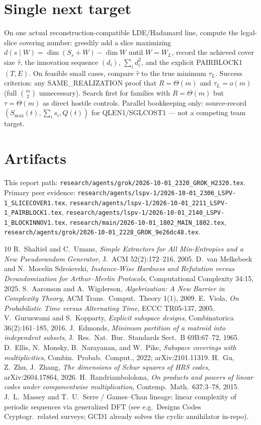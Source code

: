 \documentclass[11pt]{article}
\begin{document}
\section*{Single next target}
On one actual reconstruction-compatible LDE/Hadamard line, compute the legal-slice covering number:
greedily add a slice maximizing $d(s\mid W)=\dim(S_s+W)-\dim W$ until $W=W_L$, record the achieved
cover size $\widehat\tau$, the innovation sequence $(d_i)$, $\sum_i d_i^2$, and the explicit PAIRBLOCK1
$(T,E)$. On feasible small cases, compare $\widehat\tau$ to the true minimum $\tau_L$.
Success criterion: any SAME\_REALIZATION proof that $R=\Theta(m)$ and $\tau_L=o(m)$
(full $\binom{m}{2}$ unnecessary). Search first for families with $R=\Theta(m)$ but $\tau=\Theta(m)$
as direct hostile controls. Parallel bookkeeping only: source-record $(S_{\max}(t),\sum_i s_i,Q(t))$
for QLEN1/SGLCOST1 --- not a competing team target.

\section*{Artifacts}
This report path:
\texttt{research/agents/grok/2026-10-01\_2320\_GROK\_H2320.tex}.
Primary peer evidence:
\texttt{research/agents/lspv-1/2026-10-01\_2306\_LSPV-1\_SLICECOVER1.tex},
\texttt{research/agents/lspv-1/2026-10-01\_2211\_LSPV-1\_PAIRBLOCK1.tex},
\texttt{research/agents/lspv-1/2026-10-01\_2140\_LSPV-1\_BLOCKINNOV1.tex},
\texttt{research/main/2026-10-01\_1802\_MAIN\_1802.tex},
\texttt{research/agents/grok/2026-10-01\_2228\_GROK\_9e26dc48.tex}.

\begin{thebibliography}{10}
 R.~Shaltiel and C.~Umans, \emph{Simple Extractors for All Min-Entropies and a New Pseudorandom Generator}, J.~ACM 52(2):172--216, 2005.
 D.~van Melkebeek and N.~Mocelin Sdroievski, \emph{Instance-Wise Hardness and Refutation versus Derandomization for Arthur--Merlin Protocols}, Computational Complexity 34:15, 2025.
 S.~Aaronson and A.~Wigderson, \emph{Algebrization: A New Barrier in Complexity Theory}, ACM Trans.\ Comput.\ Theory 1(1), 2009.
 E.~Viola, \emph{On Probabilistic Time versus Alternating Time}, ECCC TR05-137, 2005.
 V.~Guruswami and S.~Kopparty, \emph{Explicit subspace designs}, Combinatorica 36(2):161--185, 2016.
 J.~Edmonds, \emph{Minimum partition of a matroid into independent subsets}, J.\ Res.\ Nat.\ Bur.\ Standards Sect.\ B 69B:67--72, 1965.
 D.~Ellis, N.~Monsky, B.~Narayanan, and W.~Pike, \emph{Subspace coverings with multiplicities}, Combin.\ Probab.\ Comput., 2022; arXiv:2101.11319.
 H.~Gu, Z.~Zhu, J.~Zhang, \emph{The dimensions of Schur squares of HRS codes}, arXiv:2604.17864, 2026.
 H.~Randriambololona, \emph{On products and powers of linear codes under componentwise multiplication}, Contemp.\ Math.\ 637:3--78, 2015.
 J.~L.~Massey and T.~U.~Serre / Games--Chan lineage: linear complexity of periodic sequences via generalized DFT (see e.g.\ Designs Codes Cryptogr.\ related surveys; GCD1 already solves the cyclic annihilator in-repo).
\end{thebibliography}
\end{document}
